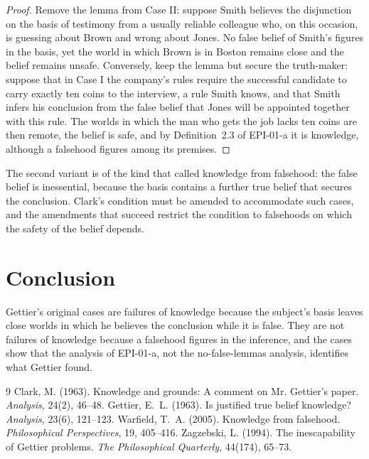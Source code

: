 \documentclass{situationist-preprint}
\begin{document}
\begin{proof}
Remove the lemma from Case II: suppose Smith believes the disjunction on the basis of testimony from a usually reliable colleague who, on this occasion, is guessing about Brown and wrong about Jones. No false belief of Smith's figures in the basis, yet the world in which Brown is in Boston remains close and the belief remains unsafe. Conversely, keep the lemma but secure the truth-maker: suppose that in Case I the company's rules require the successful candidate to carry exactly ten coins to the interview, a rule Smith knows, and that Smith infers his conclusion from the false belief that Jones will be appointed together with this rule. The worlds in which the man who gets the job lacks ten coins are then remote, the belief is safe, and by Definition~2.3 of EPI-01-a it is knowledge, although a falsehood figures among its premises.
\end{proof}

The second variant is of the kind that \citet{Warfield2005} called knowledge from falsehood: the false belief is inessential, because the basis contains a further true belief that secures the conclusion. Clark's condition must be amended to accommodate such cases, and the amendments that succeed restrict the condition to falsehoods on which the safety of the belief depends.

\section{Conclusion}

Gettier's original cases are failures of knowledge because the subject's basis leaves close worlds in which he believes the conclusion while it is false. They are not failures of knowledge because a falsehood figures in the inference, and the cases show that the analysis of EPI-01-a, not the no-false-lemmas analysis, identifies what Gettier found.

\begin{thebibliography}{9}\small
{} Clark, M. (1963). Knowledge and grounds: A comment on Mr. Gettier's paper. \emph{Analysis}, 24(2), 46--48.
 Gettier, E.~L. (1963). Is justified true belief knowledge? \emph{Analysis}, 23(6), 121--123.
 Warfield, T.~A. (2005). Knowledge from falsehood. \emph{Philosophical Perspectives}, 19, 405--416.
 Zagzebski, L. (1994). The inescapability of Gettier problems. \emph{The Philosophical Quarterly}, 44(174), 65--73.
\end{thebibliography}
\end{document}
